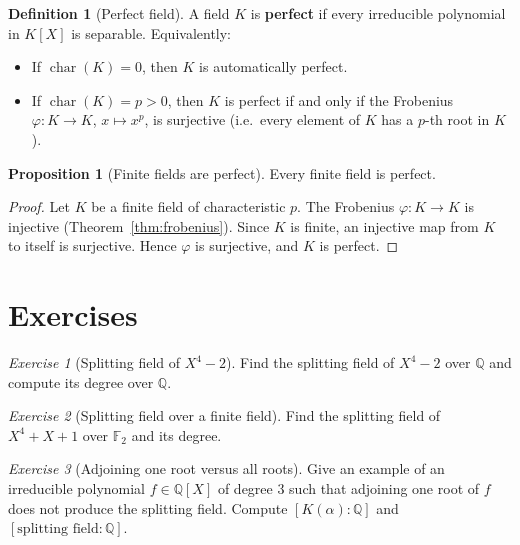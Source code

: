 \documentclass[12pt,a4paper,openany]{book}
\theoremstyle{definition}
\newtheorem{definition}{Definition}[chapter]
\newtheorem{proposition}{Proposition}[chapter]
\theoremstyle{remark}
\newtheorem{exercise}{Exercise}[chapter]
\newcommand{\Q}{\mathbb{Q}}
\newcommand{\F}{\mathbb{F}}
\DeclareMathOperator{\chr}{char}
\begin{document}
\begin{definition}[Perfect field]
\label{def:perfect-field}
A field $K$ is \textbf{perfect} if every irreducible polynomial in
$K[X]$ is separable. Equivalently:
\begin{itemize}
  \item If $\chr(K) = 0$, then $K$ is automatically perfect.
  \item If $\chr(K) = p > 0$, then $K$ is perfect if and only if
    the Frobenius $\varphi \colon K \to K$, $x \mapsto x^p$, is
    surjective (i.e.\ every element of $K$ has a $p$-th root in $K$).
\end{itemize}
\end{definition}

\begin{proposition}[Finite fields are perfect]
\label{prop:finite-perfect}
Every finite field is perfect.
\end{proposition}

\begin{proof}
Let $K$ be a finite field of characteristic $p$. The Frobenius
$\varphi \colon K \to K$ is injective
(Theorem~\ref{thm:frobenius}). Since $K$ is finite, an injective
map from $K$ to itself is surjective. Hence $\varphi$ is surjective,
and $K$ is perfect.
\end{proof}

\section{Exercises}
\label{sec:ch9-exercises}

\begin{exercise}[Splitting field of $X^4 - 2$]
\label{exer:split-X4-2}
Find the splitting field of $X^4 - 2$ over $\Q$ and compute its
degree over $\Q$.
\end{exercise}

\begin{exercise}[Splitting field over a finite field]
\label{exer:split-finite-field}
Find the splitting field of $X^4 + X + 1$ over $\F_2$ and its degree.
\end{exercise}

\begin{exercise}[Adjoining one root versus all roots]
\label{exer:one-root-all}
Give an example of an irreducible polynomial $f \in \Q[X]$ of degree
$3$ such that adjoining one root of $f$ does not produce the splitting
field. Compute $[K(\alpha):\Q]$ and $[\text{splitting field}:\Q]$.
\end{exercise}
\end{document}
